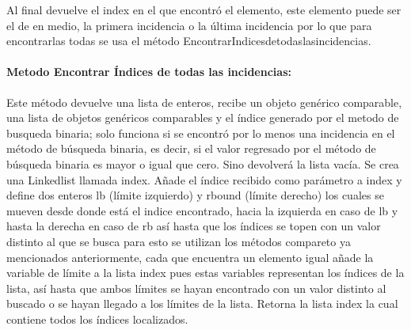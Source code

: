\documentclass{report}
\begin{document}
Al final devuelve el index en el que encontró el elemento, este elemento puede ser el de en medio, la primera incidencia o la última incidencia por lo que para encontrarlas todas se usa el método EncontrarIndicesdetodaslasincidencias.
\paragraph{Metodo Encontrar Índices de todas las incidencias:}
Este método devuelve una lista de enteros, recibe un objeto genérico comparable, una lista de objetos genéricos comparables y el índice generado por el metodo de busqueda binaria; solo funciona si se encontró por lo menos una incidencia en el método de búsqueda binaria, es decir, si el valor regresado por el método de búsqueda binaria es mayor o igual que cero.
Sino devolverá la lista vacía.
Se crea una Linkedlist llamada index.
Añade el índice recibido como parámetro a index y define dos enteros lb (límite izquierdo) y rbound (límite derecho) los cuales se mueven desde donde está el indice encontrado, hacia la izquierda en caso de lb y hasta la derecha en caso de rb así hasta que los índices se topen con un valor distinto al que se busca para esto se utilizan los métodos compareto ya mencionados anteriormente, cada que encuentra un elemento igual añade la variable de límite a la lista index pues estas variables representan los índices de la lista, así hasta que ambos límites se hayan encontrado con un valor distinto al buscado o se hayan llegado a los límites de la lista.
Retorna la lista index la cual contiene todos los índices localizados.
\end{document}
